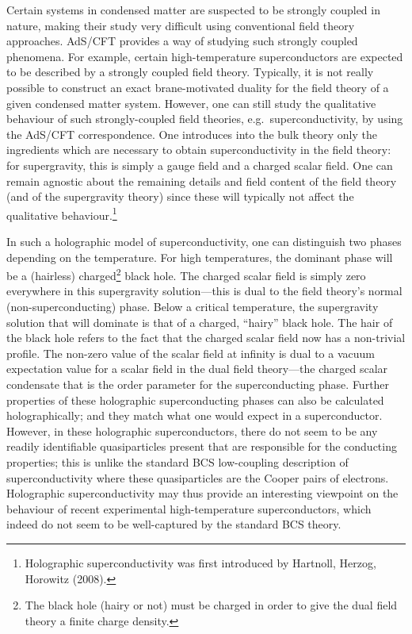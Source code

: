 \documentclass[12pt]{article}
\renewcommand{\^}[1]{\hat{#1}}
\begin{document}
Certain systems in condensed matter are suspected to be strongly coupled in nature, making their study very difficult using conventional field theory approaches. AdS/CFT provides a way of studying such strongly coupled phenomena. For example, certain high-temperature superconductors are expected to be described by a strongly coupled field theory. Typically, it is not really possible to construct an exact brane-motivated duality for the field theory of a given condensed matter system. However, one can still study the qualitative behaviour of such strongly-coupled field theories, e.g.~superconductivity, by using the AdS/CFT correspondence. One introduces into the bulk theory only the ingredients which are necessary to obtain superconductivity in the field theory: for supergravity, this is simply a gauge field and a charged scalar field. One can remain agnostic about the remaining details and field content of the field theory (and of the supergravity theory) since these will typically not affect the qualitative behaviour.\footnote{Holographic superconductivity was first introduced by Hartnoll, Herzog, Horowitz (2008).}


In such a holographic model of superconductivity, one can distinguish two phases depending on the temperature. For high temperatures, the dominant phase will be a (hairless) charged\footnote{The black hole (hairy or not) must be charged in order to give the dual field theory a finite charge density.} black hole. The charged scalar field is simply zero everywhere in this supergravity solution---this is dual to the field theory's normal (non-superconducting) phase. Below a critical temperature, the supergravity solution that will dominate is that of a charged, ``hairy'' black hole. The hair of the black hole refers to the fact that the charged scalar field now has a non-trivial profile. The non-zero value of the scalar field at infinity is dual to a vacuum expectation value for a scalar field in the dual field theory---the charged scalar condensate that is the order parameter for the superconducting phase. Further properties of these holographic superconducting phases can also be calculated holographically; and they match what one would expect in a superconductor. However, in these holographic superconductors, there do not seem to be any readily identifiable quasiparticles present that are responsible for the conducting properties; this is unlike the standard BCS low-coupling description of superconductivity where these quasiparticles are the Cooper pairs of electrons. Holographic superconductivity may thus provide an interesting viewpoint on the behaviour of recent experimental high-temperature superconductors, which indeed do not seem to be well-captured by the standard BCS theory.
\end{document}
